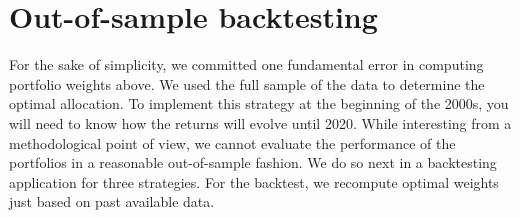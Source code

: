 \documentclass[
]{book}
\newenvironment{Shaded}{\begin{snugshade}}{\end{snugshade}}
\newcommand{\AttributeTok}[1]{\textcolor[rgb]{0.61,0.61,0.61}{#1}}
\newcommand{\ConstantTok}[1]{\textcolor[rgb]{0,0,0}{#1}}
\newcommand{\ControlFlowTok}[1]{\textcolor[rgb]{0.27,0.27,0.27}{\textbf{#1}}}
\newcommand{\DecValTok}[1]{\textcolor[rgb]{0.06,0.06,0.06}{#1}}
\newcommand{\FunctionTok}[1]{\textcolor[rgb]{0,0,0}{#1}}
\newcommand{\NormalTok}[1]{#1}
\newcommand{\OtherTok}[1]{\textcolor[rgb]{0.37,0.37,0.37}{#1}}
\newcommand{\SpecialCharTok}[1]{\textcolor[rgb]{0,0,0}{#1}}
\begin{document}
\begin{Shaded}
\end{Shaded}

\hypertarget{out-of-sample-backtesting}{%
\section{Out-of-sample backtesting}\label{out-of-sample-backtesting}}

For the sake of simplicity, we committed one fundamental error in computing portfolio weights above. We used the full sample of the data to determine the optimal allocation. To implement this strategy at the beginning of the 2000s, you will need to know how the returns will evolve until 2020. While interesting from a methodological point of view, we cannot evaluate the performance of the portfolios in a reasonable out-of-sample fashion. We do so next in a backtesting application for three strategies. For the backtest, we recompute optimal weights just based on past available data.
\end{document}
